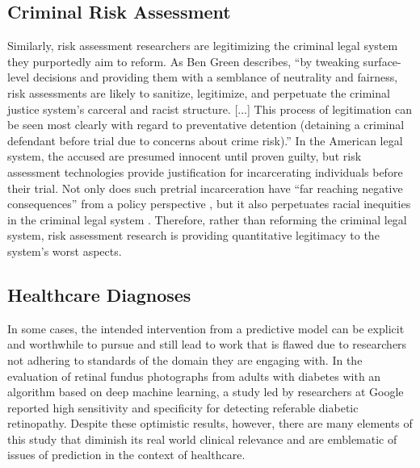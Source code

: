 \documentclass[12pt]{article}
\begin{document}
    \subsection{Criminal Risk Assessment}
    
        Similarly, risk assessment researchers are legitimizing the criminal legal system they purportedly aim to reform. As Ben Green describes, ``by tweaking surface-level decisions and providing them with a semblance of neutrality and fairness, risk assessments are likely to sanitize, legitimize, and perpetuate the criminal justice system’s carceral and racist structure. [...] This process of legitimation can be seen most clearly with regard to preventative detention (detaining a criminal defendant before trial due to concerns about crime risk).'' \cite{falsepromise} In the American legal system, the accused are presumed innocent until proven guilty, but risk assessment technologies provide justification for incarcerating individuals before their trial. Not only does such pretrial incarceration have ``far reaching negative consequences'' from a policy perspective \cite{justicedenied}, but it also perpetuates racial inequities in the criminal legal system \cite{propublica}. Therefore, rather than reforming the criminal legal system, risk assessment research is providing quantitative legitimacy to the system's worst aspects. 

    
    \subsection{Healthcare Diagnoses}
        In some cases, the intended intervention from a predictive model can be explicit and worthwhile to pursue and still lead to work that is flawed due to researchers not adhering to standards of the domain they are engaging with. In the evaluation of retinal fundus photographs from adults with diabetes with an algorithm based on deep machine learning, a study led by researchers at Google \cite{retinopathy} reported high sensitivity and specificity for detecting referable diabetic retinopathy. Despite these optimistic results, however, there are many elements of this study that diminish its real world clinical relevance and are emblematic of issues of prediction in the context of healthcare.
        
\end{document}
